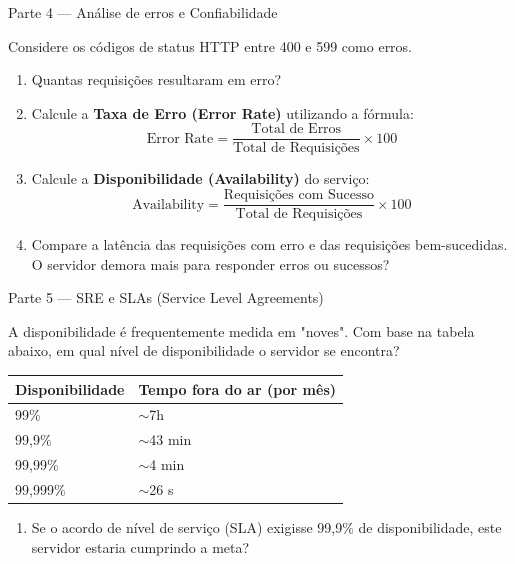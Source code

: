 \documentclass[12pt,a4paper]{report}
\begin{document}
\begin{block}{Parte 4 — Análise de erros e Confiabilidade}

Considere os códigos de status HTTP entre 400 e 599 como erros.

\begin{enumerate}
\item Quantas requisições resultaram em erro?
\item Calcule a \textbf{Taxa de Erro (Error Rate)} utilizando a fórmula:
\[ \text{Error Rate} = \frac{\text{Total de Erros}}{\text{Total de Requisições}} \times 100 \]
\item Calcule a \textbf{Disponibilidade (Availability)} do serviço:
\[ \text{Availability} = \frac{\text{Requisições com Sucesso}}{\text{Total de Requisições}} \times 100 \]
\item Compare a latência das requisições com erro e das requisições bem-sucedidas. O servidor demora mais para responder erros ou sucessos?
\end{enumerate}

\vspace{1cm}

\end{block}

\begin{block}{Parte 5 — SRE e SLAs (Service Level Agreements)}

A disponibilidade é frequentemente medida em "noves". Com base na tabela abaixo, em qual nível de disponibilidade o servidor se encontra?

\begin{center}
\begin{tabular}{|l|l|}
\hline
\textbf{Disponibilidade} & \textbf{Tempo fora do ar (por mês)} \\ \hline
99\% & $\sim$7h \\ \hline
99,9\% & $\sim$43 min \\ \hline
99,99\% & $\sim$4 min \\ \hline
99,999\% & $\sim$26 s \\ \hline
\end{tabular}
\end{center}

\begin{enumerate}
\item Se o acordo de nível de serviço (SLA) exigisse 99,9\% de disponibilidade, este servidor estaria cumprindo a meta?
\end{enumerate}

\end{block}
\end{document}
